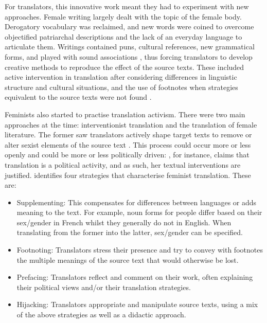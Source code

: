 For translators, this innovative work meant they had to experiment with new approaches. Female writing largely dealt with the topic of the female body. Derogatory vocabulary was reclaimed, and new words were coined to overcome objectified patriarchal descriptions and the lack of an everyday language to articulate them. Writings contained puns, cultural references, new grammatical forms, and played with sound associations \citep[15]{von2016translation}, thus forcing translators to develop creative methods to reproduce the effect of the source texts. These included active intervention in translation after considering differences in linguistic structure and cultural situations, and the use of footnotes when strategies equivalent to the source texts were not found \citep{von2016translation}. 

Feminists also started to practise translation activism. There were two main approaches at the time: interventionist translation and the translation of female literature. The former saw translators actively shape target texts to remove or alter sexist elements of the source text \citep[24--26]{von2016translation}. This process could occur more or less openly and could be more or less politically driven: \textcite[11]{lotbiniere1991re}, for instance, claims that translation is a political activity, and as such, her textual interventions are justified. \textcite[74--76]{von1991feminist} identifies four strategies that characterise feminist translation. These are:
\begin{itemize}
\setlength\itemsep{-0.5em}
    \item Supplementing: This compensates for differences between languages or adds meaning to the text. For example, noun forms for people differ based on their sex/gender in French whilst they generally do not in English. When translating from the former into the latter, sex/gender can be specified. 
    \item Footnoting: Translators stress their presence and try to convey with footnotes the multiple meanings of the source text that would otherwise be lost.
    \item Prefacing: Translators reflect and comment on their work, often explaining their political views and/or their translation strategies.
    \item Hijacking: Translators appropriate and manipulate source texts, using a mix of the above strategies as well as a didactic approach.
\end{itemize}

